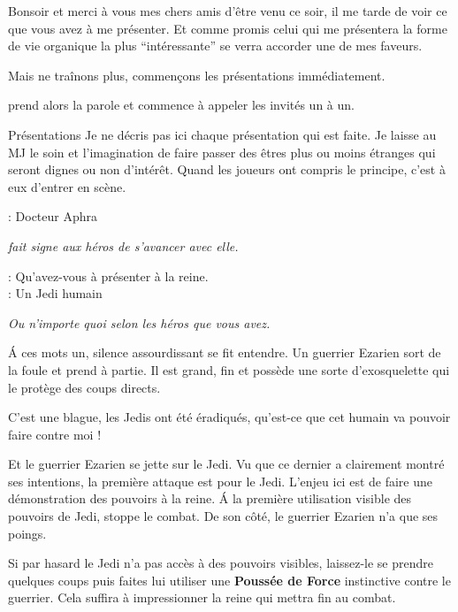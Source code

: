 \begin{quotebox}
Bonsoir et merci à vous mes chers amis d’être venu ce soir, il me tarde de voir ce que vous avez à me présenter. Et comme promis celui qui me présentera la forme de vie organique la plus “intéressante” se verra accorder une de mes faveurs.

Mais ne traînons plus, commençons les présentations immédiatement.
\end{quotebox}

 prend alors la parole et commence à appeler les invités un à un.

\begin{paperbox}{Présentations}
Je ne décris pas ici chaque présentation qui est faite. Je laisse au MJ le soin et l’imagination de faire passer des êtres plus ou moins étranges qui seront dignes ou non d’intérêt. Quand les joueurs ont compris le principe, c’est à eux d’entrer en scène.
\end{paperbox}

\begin{quotebox}
\noindent\textbf{}: Docteur Aphra

\emph{ fait signe aux héros de s’avancer avec elle.}

\noindent\textbf{}: Qu’avez-vous à présenter à la reine.\\
\noindent\textbf{}: Un Jedi humain

\emph{Ou n’importe quoi selon les héros que vous avez.}
\end{quotebox}

\'A ces mots un, silence assourdissant se fit entendre. Un guerrier Ezarien sort de la foule et prend  à partie. Il est grand, fin et possède une sorte d’exosquelette qui le protège des coups directs.

\begin{quotebox}
C’est une blague, les Jedis ont été éradiqués, qu’est-ce que cet humain va pouvoir faire contre moi !
\end{quotebox}

Et le guerrier Ezarien se jette sur le Jedi. Vu que ce dernier a clairement montré ses intentions, la première attaque est pour le Jedi. L’enjeu ici est de faire une démonstration des pouvoirs à la reine. \'A la première utilisation visible des pouvoirs de Jedi,  stoppe le combat. De son côté, le guerrier Ezarien n’a que ses poings.

Si par hasard le Jedi n’a pas accès à des pouvoirs visibles, laissez-le se prendre quelques coups puis faites lui utiliser une \textbf{Poussée de Force} instinctive contre le guerrier. Cela suffira à impressionner la reine qui mettra fin au combat.

